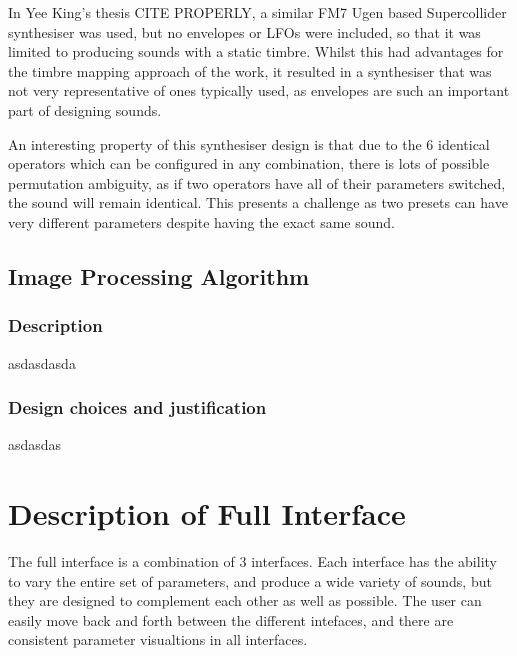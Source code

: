 \documentclass[11pt, oneside]{report}   	%
\begin{document}
In Yee King's thesis CITE PROPERLY, a similar FM7 Ugen based Supercollider synthesiser was used, but no envelopes or LFOs were included, so that it was limited to producing sounds with a static timbre. Whilst this had advantages for the timbre mapping approach of the work, it resulted in a synthesiser that was not very representative of ones typically used, as envelopes are such an important part of designing sounds. 





An interesting property of this synthesiser design is that due to the 6 identical operators which can be configured in any combination, there is lots of possible permutation ambiguity, as if two operators have all of their parameters switched, the sound will remain identical. This presents a challenge as two presets can have very different parameters despite having the exact same sound. 
\section{Image Processing Algorithm}
\subsection{Description}
asdasdasda
\subsection{Design choices and justification}
asdasdas

\chapter{Description of Full Interface}
The full interface is a combination of 3 interfaces. Each interface has the ability to vary the entire set of parameters, and produce a wide variety of sounds, but they are designed to complement each other as well as possible. The user can easily move back and forth between the different intefaces, and there are consistent parameter visualtions in all interfaces.
\end{document}
